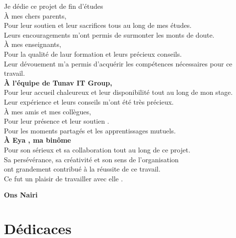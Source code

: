 \documentclass[12pt,a4paper]{report}
\begin{document}
\begin{center}
  \large 
         Je dédie ce projet de fin d'études \\
                  \vspace{0.5cm}
               À mes chers parents,\\
        Pour leur soutien et leur  sacrifices tous au long de mes études.\\
        Leurs encouragements m'ont permis de surmonter les monts de doute. \\[1cm]
         À mes enseignants, \\
        Pour la qualité de laur formation et leurs  précieux conseils.\\
        Leur dévouement m'a permis d'acquérir les compétences nécessaires pour ce travail.\\[1cm]
        \textbf{ À l'équipe de Tunav IT Group,}\\
        Pour leur accueil chaleureux et leur disponibilité tout au long de mon stage.\\
        Leur expérience et leurs conseils m'ont été très précieux.\\[1cm]
        
             À mes amis et mes collègues,\\
            Pour leur présence et leur soutien .\\
            Pour les moments partagés et les apprentissages mutuels.\\[1cm]
            
            
        \textbf{ À Eya , ma binôme}\\
        Pour son sérieux et sa collaboration tout au long de ce projet.\\
        Sa persévérance, sa créativité et son sens de l'organisation \\ 
        ont grandement contribué à la réussite de ce travail. \\
        Ce fut un plaisir de travailler avec elle .\\
        
        
        
        
         
\end{center}
\vspace{2cm}
\hfill\textbf{Ons Nairi}
\vfill
\chapter*{Dédicaces} 
 
\end{document}
